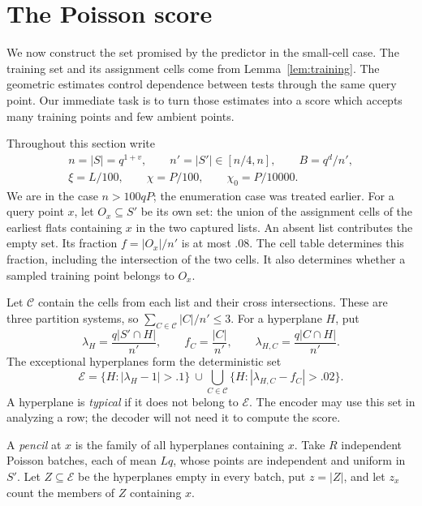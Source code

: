 \section{The Poisson score}
\label{sec:predictor-score}

We now construct the set promised by the predictor in the small-cell case.
The training set and its assignment cells come from Lemma~\ref{lem:training}.
The geometric estimates control dependence between tests through the same
query point.  Our immediate task is to turn those estimates into a score
which accepts many training points and few ambient points.

Throughout this section write
\begin{gather*}
 n=|S|=q^{1+v},\qquad n'=|S'|\in[n/4,n],\qquad B=q^d/n',\\
 \xi=L/100,\qquad \chi=P/100,\qquad \chi_0=P/10000.
\end{gather*}
We are in the case \(n>100qP\); the enumeration case was treated earlier.
For a query point \(x\), let \(O_x\subseteq S'\) be its own set: the union
of the assignment cells of the earliest flats containing \(x\) in the two
captured lists.  An absent list contributes the empty set.  Its fraction
\(f=|O_x|/n'\) is at most \(.08\).  The cell table determines this fraction,
including the intersection of the two cells.  It also determines whether a
sampled training point belongs to \(O_x\).

Let \(\mathscr C\) contain the cells from each list and their cross
intersections.  These are three partition systems, so
\(\sum_{C\in\mathscr C}|C|/n'\le3\).  For a hyperplane \(H\), put
\[
 \lambda_H=\frac{q|S'\cap H|}{n'},\qquad
 f_C=\frac{|C|}{n'},\qquad
 \lambda_{H,C}=\frac{q|C\cap H|}{n'}.
\]
The exceptional hyperplanes form the deterministic set
\begin{equation}
 \mathcal E=\{H:|\lambda_H-1|>.1\}
 \ \cup\!\bigcup_{C\in\mathscr C}
       \{H:|\lambda_{H,C}-f_C|>.02\}.
 \label{eq:exceptional-hyperplanes}
\end{equation}
A hyperplane is \emph{typical} if it does not belong to $\mathcal E$.
The encoder may use this set in analyzing a row; the decoder will not need
it to compute the score.

A \emph{pencil} at $x$ is the family of all hyperplanes containing $x$.
Take $R$ independent Poisson batches, each of mean $Lq$, whose points
are independent and uniform in $S'$.  Let $Z\subseteq\mathcal E$ be the
hyperplanes empty in every batch, put $z=|Z|$, and let $z_x$ count the
members of $Z$ containing $x$.

